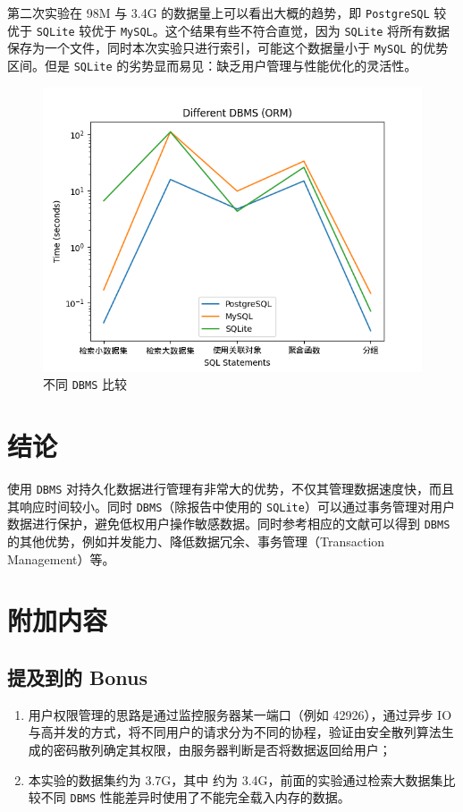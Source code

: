 第二次实验在 98M 与 3.4G 的数据量上可以看出大概的趋势，即 \texttt{PostgreSQL} 较优于 \texttt{SQLite} 较优于 \texttt{MySQL}。这个结果有些不符合直觉，因为 \texttt{SQLite} 将所有数据保存为一个文件，同时本次实验只进行索引，可能这个数据量小于 \texttt{MySQL} 的优势区间。但是 \texttt{SQLite} 的劣势显而易见：缺乏用户管理与性能优化的灵活性。
\begin{figure}[H]
    \centering
    \includegraphics[width=.5\textwidth]{code/plot/different_dbms.png}
    \caption{不同 \texttt{DBMS} 比较}\label{F:different_dbms}
\end{figure}



\section{结论}
使用 \texttt{DBMS} 对持久化数据进行管理有非常大的优势，不仅其管理数据速度快，而且其响应时间较小。同时 \texttt{DBMS}（除报告中使用的 \texttt{SQLite}）可以通过事务管理对用户数据进行保护，避免低权用户操作敏感数据。同时参考相应的文献可以得到 \texttt{DBMS} 的其他优势，例如并发能力、降低数据冗余、事务管理（Transaction Management）等。



\section{附加内容}\label{S:extra}
\subsection{提及到的 Bonus}
\begin{enumerate}
    \item 用户权限管理的思路是通过监控服务器某一端口（例如 42926），通过异步 IO 与高并发的方式，将不同用户的请求分为不同的协程，验证由安全散列算法生成的密码散列确定其权限，由服务器判断是否将数据返回给用户；
    \item 本实验的数据集约为 3.7G，其中  约为 3.4G，前面的实验通过检索大数据集比较不同 \texttt{DBMS} 性能差异时使用了不能完全载入内存的数据。
\end{enumerate}



